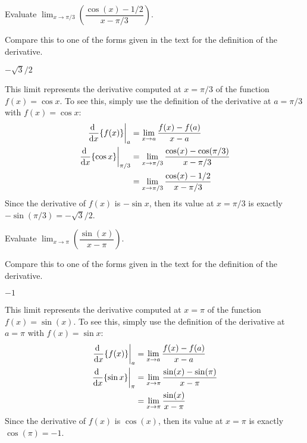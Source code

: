 \begin{question}[2015Q]
Evaluate $\displaystyle \lim_{x\to \pi/3}\left(
\dfrac{\cos(x)-1/2}{x-\pi/3}\right).$
\end{question}
\begin{hint}
Compare this to one of the forms given in the text for the definition of the derivative.
\end{hint}
\begin{answer}
{$-\sqrt{3}/2$}
\end{answer}
\begin{solution}
This limit represents the derivative computed at $x=\pi/3$ of the function
$f(x)=\cos x$. To see this, simply use the definition of the derivative at $a=\pi/3$ with $f(x)=\cos x$:
\begin{align*}
\left.\diff{}{x}\{f(x)\}\right|_{a} &= \lim_{x \to a}\frac{f(x)-f(a)}{x-a}\\
\left.\diff{}{x}\{\cos x\}\right|_{\pi/3} &= \lim_{x\to\pi/3}\frac{\cos(x)-\cos(\pi/3)}{x-\pi/3}\\
&=\lim_{x\to\pi/3} \frac{\cos(x)-1/2}{x-\pi/3}
\end{align*}
Since the derivative of $f(x)$ is $-\sin x$, then its
value at $x=\pi/3$ is exactly\\ $-\sin(\pi/3)=-\sqrt{3}/2$.
\end{solution}



\begin{question}[2015Q]
Evaluate $\displaystyle \lim_{x\to \pi}\left(\dfrac{\sin(x)}{x-\pi}\right).$
\end{question}
\begin{hint}
Compare this to one of the forms given in the text for the definition of the derivative.
\end{hint}
\begin{answer} $-1$
\end{answer}
\begin{solution}
    This limit represents the derivative computed at $x=\pi$ of the function $f(x)=\sin(x)$.
    To see this, simply use the definition of the derivative at $a=\pi$ with $f(x)=\sin x$:
\begin{align*}
\left.\diff{}{x}\{f(x)\}\right|_{a} &= \lim_{x \to a}\frac{f(x)-f(a)}{x-a}\\
\left.\diff{}{x}\{\sin x\}\right|_{\pi} &=\lim_{x\to\pi} \frac{\sin(x)-\sin(\pi)}{x-\pi}\\
 &=\lim_{x\to\pi} \frac{\sin(x)}{x-\pi}
\end{align*}
    Since the derivative of $f(x)$ is $\cos(x)$, then its value at $x=\pi$ is exactly\\
     $\cos(\pi)=-1$.
\end{solution}






